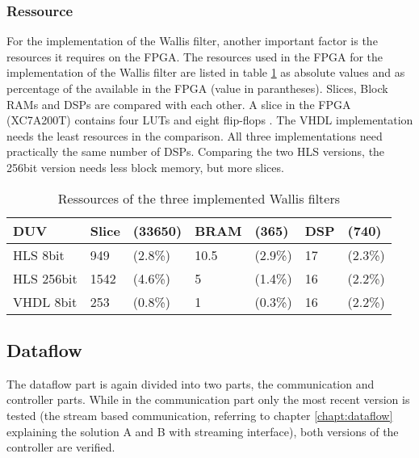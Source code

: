 \subsubsection*{Ressource} \label{ch:ver:ip:ressource}
For the implementation of the Wallis filter, another important factor is the
resources it requires on the FPGA. The resources used in the FPGA for the
implementation of the Wallis filter are listed in table \ref{tab:ressource} as
absolute values and as percentage of the available in the FPGA (value in
parantheses).
Slices, Block RAMs and DSPs are compared with each other. A slice in the FPGA 
(XC7A200T) contains four LUTs and eight flip-flops \cite{ds180}.
The VHDL implementation needs the least resources in the comparison. All
three implementations need practically the same number of DSPs. Comparing
the two HLS versions, the 256bit version needs less block memory, but more
slices.

\begin{table}[tb!]
    \centering
    \begin{tabular}{l l l l l l l}
        \toprule
        DUV         & Slice & (33650) & BRAM & (365) & DSP & (740) \\
        \midrule
        HLS  8bit    & 949 & (2.8\%)   & 10.5 & (2.9\%)  & 17 & (2.3\%) \\
        HLS  256bit  & 1542 & (4.6\%)  & 5 & (1.4\%)     & 16 & (2.2\%) \\
        VHDL 8bit       & 253 & (0.8\%)   & 1 & (0.3\%)     & 16 & (2.2\%) \\
        \bottomrule
    \end{tabular}
    \caption{Ressources of the three implemented Wallis filters}
    \label{tab:ressource}
\end{table}


%
%
\subsection{Dataflow}\label{ch:verification:dataflow}
The dataflow part is again divided into two parts, the communication and
controller parts. While in the communication part only the most recent version
is tested (the stream based communication, referring to chapter 
\ref{chapt:dataflow} explaining the solution
A and B with streaming interface), both versions of the controller are verified.

